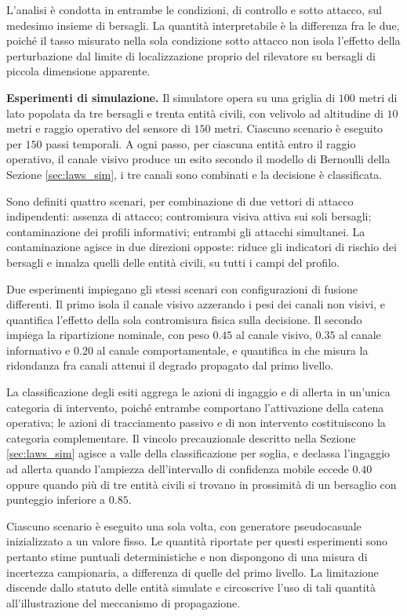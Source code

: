 \documentclass[a4paper,12pt]{report}
\begin{document}
L'analisi è condotta in entrambe le condizioni, di controllo e sotto attacco,
sul medesimo insieme di bersagli. La quantità interpretabile è la differenza fra
le due, poiché il tasso misurato nella sola condizione sotto attacco non isola
l'effetto della perturbazione dal limite di localizzazione proprio del
rilevatore su bersagli di piccola dimensione apparente.

\textbf{Esperimenti di simulazione.}
\label{sec:esperimenti_sim}
Il simulatore opera su una griglia di $100$ metri di lato popolata da tre
bersagli e trenta entità civili, con velivolo ad altitudine di $10$ metri e
raggio operativo del sensore di $150$ metri. Ciascuno scenario è eseguito per
$150$ passi temporali. A ogni passo, per ciascuna entità entro il raggio
operativo, il canale visivo produce un esito secondo il modello di Bernoulli
della Sezione \ref{sec:laws_sim}, i tre canali sono combinati e la decisione è
classificata.

Sono definiti quattro scenari, per combinazione di due vettori di attacco
indipendenti: assenza di attacco; contromisura visiva attiva sui soli bersagli;
contaminazione dei profili informativi; entrambi gli attacchi simultanei. La
contaminazione agisce in due direzioni opposte: riduce gli indicatori di
rischio dei bersagli e innalza quelli delle entità civili, su tutti i campi
del profilo.

Due esperimenti impiegano gli stessi scenari con configurazioni di fusione
differenti. Il primo isola il canale visivo azzerando i pesi dei canali non
visivi, e quantifica l'effetto della sola contromisura fisica sulla decisione.
Il secondo impiega la ripartizione nominale, con peso $0.45$ al canale visivo,
$0.35$ al canale informativo e $0.20$ al canale comportamentale, e quantifica in
che misura la ridondanza fra canali attenui il degrado propagato dal primo
livello.

La classificazione degli esiti aggrega le azioni di ingaggio e di allerta in
un'unica categoria di intervento, poiché entrambe comportano l'attivazione della
catena operativa; le azioni di tracciamento passivo e di non intervento
costituiscono la categoria complementare. Il vincolo precauzionale descritto
nella Sezione \ref{sec:laws_sim} agisce a valle della classificazione per
soglia, e declassa l'ingaggio ad allerta quando l'ampiezza dell'intervallo di
confidenza mobile eccede $0.40$ oppure quando più di tre entità civili si
trovano in prossimità di un bersaglio con punteggio inferiore a $0.85$.

Ciascuno scenario è eseguito una sola volta, con generatore pseudocasuale
inizializzato a un valore fisso. Le quantità riportate per questi esperimenti
sono pertanto stime puntuali deterministiche e non dispongono di una misura di
incertezza campionaria, a differenza di quelle del primo livello. La limitazione
discende dallo statuto delle entità simulate e circoscrive l'uso di tali
quantità all'illustrazione del meccanismo di propagazione.
\end{document}
